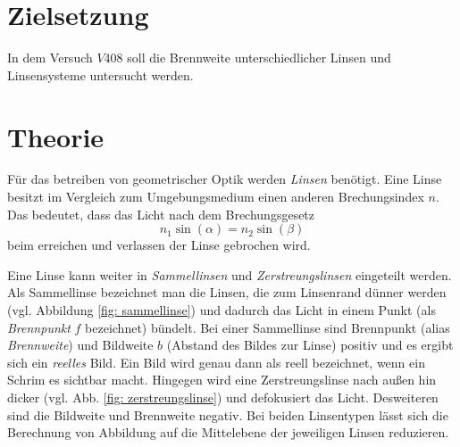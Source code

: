 \setcounter{page}{1}
\section*{Zielsetzung}
In dem Versuch $V408$ soll die Brennweite unterschiedlicher Linsen und
Linsensysteme untersucht werden.
\section{Theorie}
Für das betreiben von geometrischer Optik werden \emph{Linsen} benötigt.
Eine Linse besitzt im Vergleich zum Umgebungsmedium einen anderen Brechungsindex $n$.
Das bedeutet, dass das Licht nach dem Brechungsgesetz
\begin{equation*}
  n_1\sin(\alpha)=n_2\sin(\beta)
\end{equation*}
beim erreichen und verlassen der Linse gebrochen wird.

Eine Linse kann weiter in \emph{Sammellinsen} und \emph{Zerstreungslinsen}
eingeteilt werden. Als Sammellinse bezeichnet man die Linsen, die zum Linsenrand
dünner werden (vgl. Abbildung \ref{fig: sammellinse}) und dadurch das Licht in einem Punkt (als \emph{Brennpunkt} $f$ bezeichnet)
bündelt.
Bei einer Sammellinse sind Brennpunkt (alias \emph{Brennweite})
und Bildweite $b$ (Abstand des Bildes zur Linse) positiv und es ergibt sich ein
\emph{reelles} Bild. Ein Bild wird genau dann als reell bezeichnet, wenn
 ein Schrim es sichtbar macht.
Hingegen wird eine Zerstreungslinse nach außen hin dicker (vgl. Abb. \ref{fig: zerstreungslinse}) und
defokusiert das Licht. Desweiteren sind die Bildweite und Brennweite negativ.
Bei beiden Linsentypen lässt sich die Berechnung von Abbildung auf die Mittelebene
der jeweiligen Linsen reduzieren.

